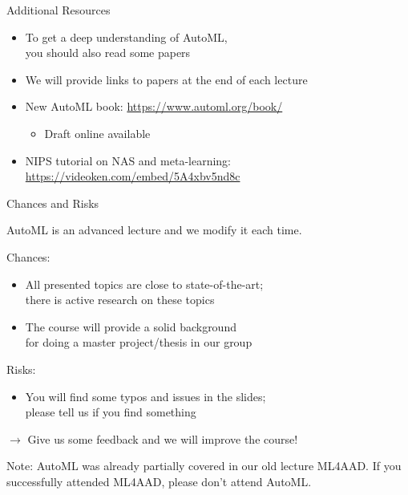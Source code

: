 \begin{frame}[c]{Additional Resources}

\begin{itemize}
  \item To get a deep understanding of AutoML,\\ you should also read some papers 
  \item We will provide links to papers at the end of each lecture
  \item New AutoML book: \url{https://www.automl.org/book/}
  \begin{itemize}
    \item Draft online available
  \end{itemize}
  \item NIPS tutorial on NAS and meta-learning: \url{https://videoken.com/embed/5A4xbv5nd8c}
\end{itemize}

\end{frame}
\begin{frame}[c]{Chances and Risks}

AutoML is an advanced lecture and we modify it each time.

\bigskip
\pause

Chances:
\begin{itemize}
  \item All presented topics are close to state-of-the-art;\\there is active research on these topics  
  \item The course will provide a solid background\\ for doing a master project/thesis in our group 
\end{itemize}

\medskip

Risks:
\begin{itemize}
  \item You will find some typos and issues in the slides;\\ please tell us if you find something
\end{itemize}

\medskip
\pause
$\to$ Give us some feedback and we will improve the course!

\medskip
\pause
Note: AutoML was already partially covered in our old lecture ML4AAD. 
If you successfully attended ML4AAD, please don't attend AutoML.

\end{frame}
